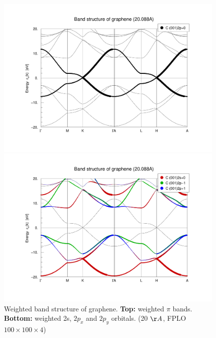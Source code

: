 				\begin{figure}
					\begin{minipage}[t]{\textwidth}
						\includegraphics[width=\textwidth]{Results/Graphene/Graphene20A/graphene20APi.pdf}
					\end{minipage}
					\begin{minipage}[t]{\textwidth}
						\includegraphics[width=\textwidth]{Results/Graphene/Graphene20A/graphene20ASigma.pdf}
					\end{minipage}
					\caption{Weighted band structure of graphene. \textbf{Top:} weighted $\pi$ bands. \textbf{Bottom:} weighted 2s, $2p_x$ and $2p_y$ orbitals. (20 $\AA$, FPLO $100\times100\times4$)}
					\label{fig:GraphenePiSigma}
				\end{figure}

